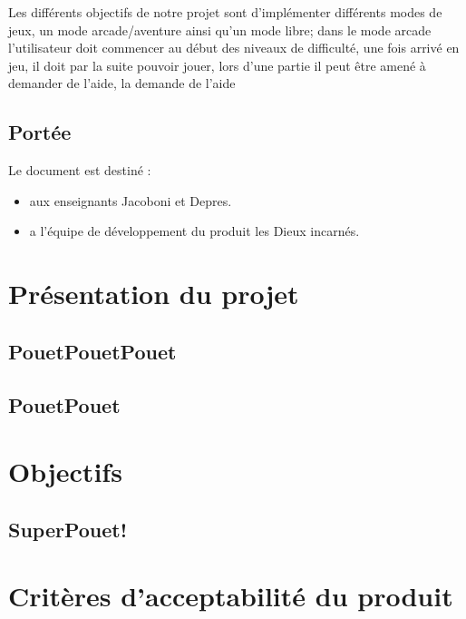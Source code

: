 \documentclass[12pt,a4paper]{article}
\begin{document}
    Les différents objectifs de notre projet sont d’implémenter différents modes de jeux, un mode arcade/aventure ainsi qu’un mode libre; dans le mode arcade l’utilisateur doit commencer au début des niveaux de difficulté, une fois arrivé en jeu, il doit par la suite pouvoir jouer, lors d’une partie il peut être amené à demander de l’aide, la demande de l’aide 
        \vspace{1cm}


        \subsection{Portée}

        Le document est destiné :
        \begin{itemize}
            \item aux enseignants Jacoboni et Depres.
            \item a l'équipe de développement du produit les Dieux incarnés.
        \end{itemize}

        \vspace{0.5cm}
        \newpage
        
    \section{Présentation du projet}
        \subsection{PouetPouetPouet}
		
		\subsection{PouetPouet}
		
        \newpage
        
        
    \section{Objectifs}
        \subsection{SuperPouet!}
		\newpage
	    
	\section{Critères d’acceptabilité du produit}
\end{document}
